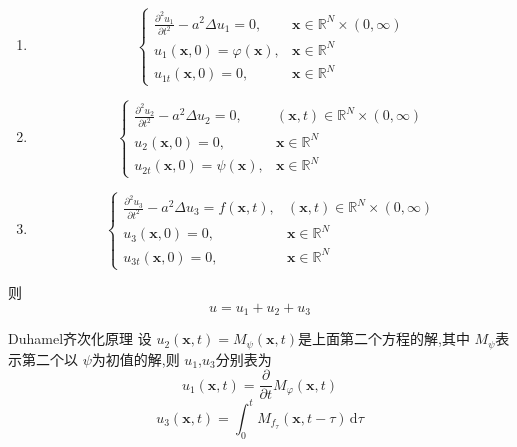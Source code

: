 \documentclass[../../PDE.tex]{subfiles}
\begin{document}
\begin{enumerate}
    \item \begin{equation}
        \begin{cases} \frac{\partial ^{2}u_1}{\partial t^{2}}-a^{2} \Delta u_1= 0,&\mathbf{x}\in \mathbb{R} ^{N}\times \left( 0,\infty \right)    \\ 
            u_1\left( \mathbf{x},0 \right)=  \varphi \left( \mathbf{x} \right),&\mathbf{x}\in \mathbb{R} ^{N} \\ 
             u_{1t}\left( \mathbf{x},0 \right)= 0,&\mathbf{x}\in \mathbb{R} ^{N}   \end{cases} 
    \end{equation}
    \item \begin{equation}
        \begin{cases} \frac{\partial ^{2}u_2}{\partial t^{2}}-a^{2} \Delta u_2= 0,&\left( \mathbf{x},t  \right)\in \mathbb{R} ^{N}\times \left( 0,\infty \right)    \\ 
            u_2\left( \mathbf{x},0 \right)= 0,&\mathbf{x}\in \mathbb{R} ^{N} \\ 
             u_{2t}\left( \mathbf{x},0 \right)= \psi \left( \mathbf{x} \right),&\mathbf{x}\in \mathbb{R} ^{N}   \end{cases} 
    \end{equation}
    \item \begin{equation}
        \begin{cases} \frac{\partial ^{2}u_3}{\partial t^{2}}-a^{2} \Delta u_3= f\left( \mathbf{x},t \right),&\left( \mathbf{x},t  \right)\in \mathbb{R} ^{N}\times \left( 0,\infty \right)    \\ 
            u_3\left( \mathbf{x},0 \right)=  0,&\mathbf{x}\in \mathbb{R} ^{N} \\ 
             u_{3t}\left( \mathbf{x},0 \right)= 0,&\mathbf{x}\in \mathbb{R} ^{N}   \end{cases} 
    \end{equation}
\end{enumerate}
则 \[
u= u_1+ u_2+ u_3
\]


\begin{theorem}{Duhamel齐次化原理}
    设 \(  u_2\left( \mathbf{x},t \right)= M_{\psi }\left( \mathbf{x},t \right)    \)是上面第二个方程的解,其中 \(  M_{\psi }  \)表示第二个以 \(  \psi   \)为初值的解,则 \(  u_1  \),\(  u_3  \)分别表为
    \begin{equation}
      u_1\left( \mathbf{x},t \right)= \frac{\partial }{\partial t}M_{ \varphi } \left( \mathbf{x},t \right) 
    \end{equation}
    \begin{equation}
      u_3\left( \mathbf{x},t \right)= \int_{0}^{t}M_{f_{\tau }}\left( \mathbf{x},t-\tau  \right)\,\mathrm{d} \tau   
    \end{equation}     
\end{theorem}
\end{document}
